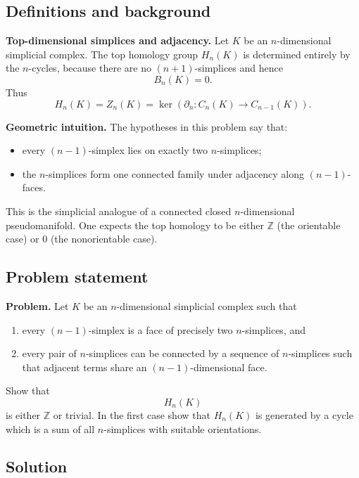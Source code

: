 \documentclass[12pt,a4paper]{article}
\theoremstyle{notespace}
\begin{document}
\subsection{Definitions and background}

\textbf{Top-dimensional simplices and adjacency.}
Let \(K\) be an \(n\)-dimensional simplicial complex. The top homology group \(H_n(K)\) is determined entirely by the \(n\)-cycles, because there are no \((n+1)\)-simplices and hence
\[
B_n(K)=0.
\]
Thus
\[
H_n(K)=Z_n(K)=\ker(\partial_n:C_n(K)\to C_{n-1}(K)).
\]

\medskip

\textbf{Geometric intuition.}
The hypotheses in this problem say that:

\begin{itemize}
	\item every \((n-1)\)-simplex lies on exactly two \(n\)-simplices;
	\item the \(n\)-simplices form one connected family under adjacency along \((n-1)\)-faces.
\end{itemize}

This is the simplicial analogue of a connected closed \(n\)-dimensional pseudomanifold. One expects the top homology to be either \(\mathbb Z\) (the orientable case) or \(0\) (the nonorientable case).

\subsection{Problem statement}

\textbf{Problem.}
Let \(K\) be an \(n\)-dimensional simplicial complex such that

\begin{enumerate}
	\item[(i)] every \((n-1)\)-simplex is a face of precisely two \(n\)-simplices, and
	\item[(ii)] every pair of \(n\)-simplices can be connected by a sequence of \(n\)-simplices such that adjacent terms share an \((n-1)\)-dimensional face.
\end{enumerate}

Show that
\[
H_n(K)
\]
is either \(\mathbb Z\) or trivial. In the first case show that \(H_n(K)\) is generated by a cycle which is a sum of all \(n\)-simplices with suitable orientations.

\subsection{Solution}
\end{document}
